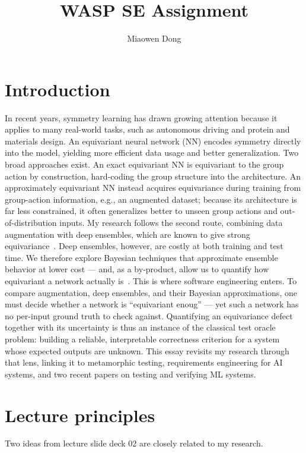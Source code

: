 \documentclass[11pt, a4paper]{article}
\title{WASP SE Assignment}
\author{Miaowen Dong}
\begin{document}
\maketitle

\section{Introduction}

In recent years, symmetry learning has drawn growing attention because it applies to many real-world tasks, such as autonomous driving and protein and materials design. An equivariant neural network (NN) encodes symmetry directly into the model, yielding more efficient data usage and better generalization. Two broad approaches exist. An exact equivariant NN is equivariant to the group action by construction, hard-coding the group structure into the architecture. An approximately equivariant NN instead acquires equivariance during training from group-action information, e.g., an augmented dataset; because its architecture is far less constrained, it often generalizes better to unseen group actions and out-of-distribution inputs. My research follows the second route, combining data augmentation with deep ensembles, which are known to give strong equivariance~\cite{gerkenEmergentEquivarianceDeep2024}. Deep ensembles, however, are costly at both training and test time. We therefore explore Bayesian techniques that approximate ensemble behavior at lower cost — and, as a by-product, allow us to quantify how equivariant a network actually is~\cite{dong2026equivarianceaugmentationbayesianneural}. This is where software engineering enters. To compare augmentation, deep ensembles, and their Bayesian approximations, one must decide whether a network is ``equivariant enoug'' — yet such a network has no per-input ground truth to check against. Quantifying an equivariance defect together with its uncertainty is thus an instance of the classical test oracle problem: building a reliable, interpretable correctness criterion for a system whose expected outputs are unknown. This essay revisits my research through that lens, linking it to metamorphic testing, requirements engineering for AI systems, and two recent papers on testing and verifying ML systems.

\section{Lecture principles}
\label{sec:lecture}

Two ideas from lecture slide deck 02 are closely related to my research.
\end{document}
